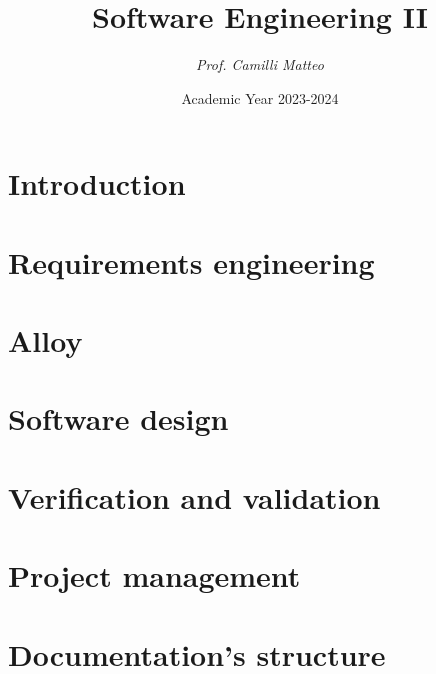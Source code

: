 \documentclass[12pt, a4paper]{report}
\title{\textbf{Software Engineering II}}
\author{\textit{Prof. Camilli Matteo}}
\date{Academic Year 2023-2024}
\begin{document}
    \maketitle

    

    \cleardoublepage
    
    \tableofcontents

    \cleardoublepage

    \chapter{Introduction}
    
    
    
       

    \chapter{Requirements engineering}
    
    
    
      
    
    
    
     
     

    \chapter{Alloy}
    
    
    
    

    \chapter{Software design}
    
    
    
    
    
    

    \chapter{Verification and validation}
    
    
    
    

    \chapter{Project management}
    
    
    
    
    

    \chapter{Documentation's structure}
    
    
    
\end{document}

